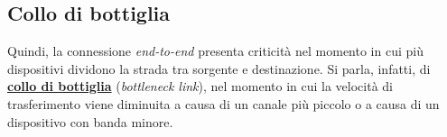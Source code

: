 \documentclass[a4paper]{article}
\begin{document}
	\subsection{Collo di bottiglia}

	\noindent
	Quindi, la connessione \emph{end-to-end} presenta criticità nel momento in cui più dispositivi dividono la strada tra sorgente e destinazione. Si parla, infatti, di \textcolor{Red3}{\textbf{\underline{collo di bottiglia}}} (\emph{bottleneck link}), nel momento in cui la velocità di trasferimento viene diminuita a causa di un canale più piccolo o a causa di un dispositivo con banda minore.
\end{document}

